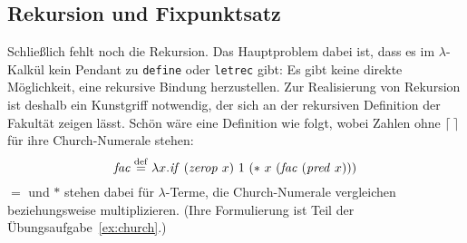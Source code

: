 \subsection{Rekursion und Fixpunktsatz}
\label{sec:fixpunktsatz}
%
Schließlich fehlt noch die Rekursion.  Das Hauptproblem dabei ist, dass
es im $\lambda$-Kalkül kein Pendant zu \texttt{define} oder
\texttt{letrec} gibt: Es gibt keine direkte Möglichkeit, eine
rekursive Bindung herzustellen.  Zur Realisierung von Rekursion ist
deshalb ein Kunstgriff notwendig, der sich an der rekursiven
Definition der Fakultät zeigen lässt.
Schön wäre eine Definition wie folgt, wobei Zahlen ohne $\lceil\:\rceil$ für
ihre Church-Numerale stehen:
%
\begin{displaymath}
  \mathit{fac} \stackrel{\rm def}{=}{} \lambda x.\mathit{if}~(\mathit{zerop}~x)~1~(\ast~x~(\mathit{fac}~(\mathit{pred}~x)))
\end{displaymath}
%
$=$ und $\ast$ stehen dabei für $\lambda$-Terme, die Church-Numerale
vergleichen beziehungsweise multiplizieren.  (Ihre Formulierung ist Teil der
Übungsaufgabe~\ref{ex:church}.)

